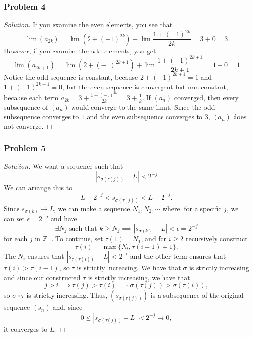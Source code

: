 \documentclass[11pt]{article}
\newcommand{\1}{\mathbf{1}}
\theoremstyle{definition}
\newenvironment{solution}{\begin{proof}[Solution]}{\end{proof}}
\begin{document}
\subsubsection*{Problem 4}
\begin{solution}
    If you examine the even elements, you see that
    \[\lim (a_{2k}) = \lim(2 + (-1)^{2k}) + \lim \frac{1+(-1)^{2k}}{2k} = 3 + 0 = 3\]
    However, if you examine the odd elements, you get
    \[\lim (a_{2k+1}) = \lim (2 + (-1)^{2k+1}) + \lim \frac{1+(-1)^{2k+1}}{2k+1} = 1 + 0 =
    1\]
    Notice the odd sequence is constant, because \(2 + (-1)^{2k+1} = 1\) and
    \(1+(-1)^{2k+1} = 0\), but the even sequence is convergent but non constant, because
    each term \(a_{2k} = 3 + \frac{1+(-1)^{2k}}{2k} = 3 + \frac{1}{k}\).
    If \((a_n)\) converged, then every subsequence of \((a_n)\) would converge to the same
    limit. Since the odd subsequence converges to \(1\) and the even subsequence converges
    to \(3\), \((a_n)\) does not converge.
\end{solution}
\subsubsection*{Problem 5}
\begin{solution}
    We want a sequence such that $$|s_{\sigma(\tau(j))} - L| < 2^{-j}$$
    We can arrange this to
    $$L-2^{-j}<s_{\sigma(\tau(j))}<L+2^{-j}.$$
    Since $s_{\sigma(k)} \rightarrow L$, we can make a sequence $N_1, N_2, \cdots $
    where, for a specific \(j\), we can set $\epsilon = 2^{-j}$ and have
$$\exists  N_j \text{ such that } k \ge N_j \implies |s_{\sigma(k)} - L| < \epsilon = 2^{-j}$$
for each $j$ in $\mathbb{Z}^{+}$. To continue, set \(\tau(1)=N_1\), and for \(i\ge2\)
recursively construct
\[
\tau(i) = \max\{N_i, \tau(i-1) + 1\}.
\]
The $N_i$ ensures that $|s_{\sigma(\tau(i))}-L|<2^{-i}$ and the other term ensures that
\(\tau(i)>\tau(i-1)\), so \(\tau\) is strictly increasing.
We have that $\sigma$ is strictly increasing and since our constructed $\tau$ is
strictly increasing, we have that
\[
j > i \implies \tau(j) > \tau(i) \implies
\sigma(\tau(j)) > \sigma(\tau(i)),
\]
so \(\sigma\circ\tau\) is strictly increasing.
Thus, $(s_{\sigma(\tau(j))})$ is a subsequence of the original sequence $(s_n)$ and,
since
\[
0\le |s_{\sigma(\tau(j))}-L|<2^{-j}\rightarrow0,
\]
it converges to \(L\).
\end{solution}
\end{document}

